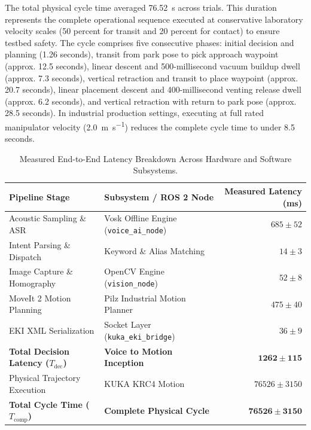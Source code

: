 \documentclass[runningheads]{llncs}
\begin{document}
The total physical cycle time averaged \SI{76.52}{\second} across trials. This duration represents the complete operational sequence executed at conservative laboratory velocity scales (50 percent for transit and 20 percent for contact) to ensure testbed safety. The cycle comprises five consecutive phases: initial decision and planning (1.26 seconds), transit from park pose to pick approach waypoint (approx. 12.5 seconds), linear descent and 500-millisecond vacuum buildup dwell (approx. 7.3 seconds), vertical retraction and transit to place waypoint (approx. 20.7 seconds), linear placement descent and 400-millisecond venting release dwell (approx. 6.2 seconds), and vertical retraction with return to park pose (approx. 28.5 seconds). In industrial production settings, executing at full rated manipulator velocity (\SI{2.0}{\meter\per\second}) reduces the complete cycle time to under 8.5 seconds.

\begin{table}[tb]
\caption{Measured End-to-End Latency Breakdown Across Hardware and Software Subsystems.}
\label{tab:latency_breakdown}
\centering
\begin{tabular}{llr}
\toprule
\textbf{Pipeline Stage} & \textbf{Subsystem / ROS 2 Node} & \textbf{Measured Latency (ms)} \\
\midrule
Acoustic Sampling \& ASR & Vosk Offline Engine (\texttt{voice\_ai\_node})~\cite{vosk2020} & $685 \pm 52$ \\
Intent Parsing \& Dispatch & Keyword \& Alias Matching & $14 \pm 3$ \\
Image Capture \& Homography & OpenCV Engine (\texttt{vision\_node}) & $52 \pm 8$ \\
MoveIt 2 Motion Planning & Pilz Industrial Motion Planner~\cite{pilz_motion2021} & $475 \pm 40$ \\
EKI XML Serialization & Socket Layer (\texttt{kuka\_eki\_bridge})~\cite{kuka_eki_eval2022} & $36 \pm 9$ \\
\midrule
\textbf{Total Decision Latency ($T_{\text{dec}}$)} & \textbf{Voice to Motion Inception} & $\mathbf{1262 \pm 115}$ \\
Physical Trajectory Execution & KUKA KRC4 Motion & $76526 \pm 3150$ \\
\midrule
\textbf{Total Cycle Time ($T_{\text{comp}}$)} & \textbf{Complete Physical Cycle} & $\mathbf{76526 \pm 3150}$ \\
\bottomrule
\end{tabular}
\end{table}
\end{document}
